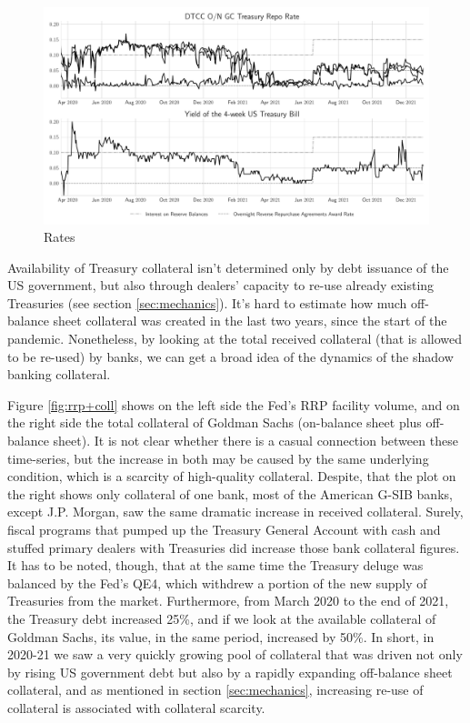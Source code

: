 \documentclass[11pt,a4paper,english,oneside]{article}
\begin{document}
\begin{figure}[htb!]
  \begin{center}
    \caption{Rates}
    \label{fig:rates}
    \includegraphics[width=0.99\linewidth]{rates.pdf}
  \end{center}
\end{figure}

Availability of Treasury collateral isn't determined only by debt issuance of the US government, but also through dealers' capacity to re-use already existing Treasuries (see section \ref{sec:mechanics}). It's hard to estimate how much off-balance sheet collateral was created in the last two years, since the start of the pandemic. Nonetheless, by looking at the total received collateral (that is allowed to be re-used) by banks, we can get a broad idea of the dynamics of the shadow banking collateral.

Figure \ref{fig:rrp+coll} shows on the left side the Fed's RRP facility volume, and on the right side the total collateral of Goldman Sachs (on-balance sheet plus off-balance sheet). It is not clear whether there is a casual connection between these time-series, but the increase in both may be caused by the same underlying condition, which is a scarcity of high-quality collateral. Despite, that the plot on the right shows only collateral of one bank, most of the American G-SIB  banks, except J.P. Morgan, saw the same dramatic increase in received collateral. Surely, fiscal programs that pumped up the Treasury General Account with cash and stuffed primary dealers with Treasuries did increase those bank collateral figures. It has to be noted, though, that at the same time the Treasury deluge was balanced by the Fed's QE4, which withdrew a portion of the new supply of Treasuries from the market. Furthermore, from March 2020 to the end of 2021, the Treasury debt increased 25\%, and if we look at the available collateral of Goldman Sachs, its value, in the same period, increased by 50\%. In short, in 2020-21 we saw a very quickly growing pool of collateral that was driven not only by rising US government debt but also by a rapidly expanding off-balance sheet collateral, and as mentioned in section \ref{sec:mechanics}, increasing re-use of collateral is associated with collateral scarcity.
\end{document}
